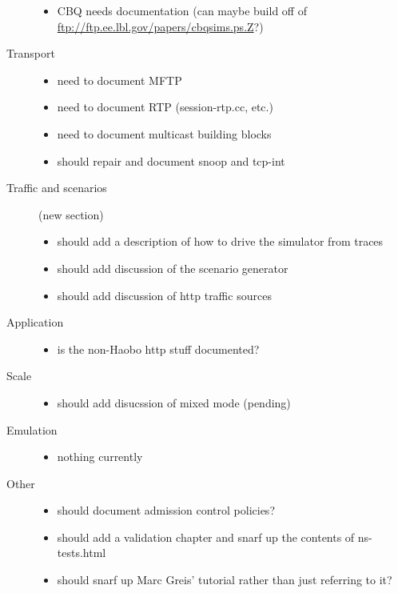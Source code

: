 \begin{description}
	\begin{itemize}
	\item CBQ needs documentation (can maybe build off of 
		\url{ftp://ftp.ee.lbl.gov/papers/cbqsims.ps.Z}?)
	\end{itemize}

\item[Transport]

	\begin{itemize}
	\item need to document MFTP
	\item need to document RTP (session-rtp.cc, etc.)
	\item need to document multicast building blocks
	\item should repair and document snoop and tcp-int
	\end{itemize}

\item[Traffic and scenarios] (new section)

	\begin{itemize}
	\item should add a description of how to drive the simulator
		from traces
	\item should add discussion of the scenario generator
	\item should add discussion of http traffic sources
	\end{itemize}

\item[Application]

	\begin{itemize}
	\item is the non-Haobo http stuff documented?
	\end{itemize}

\item[Scale]

	\begin{itemize}
	\item should add disucssion of mixed mode (pending)
	\end{itemize}

\item[Emulation]

	\begin{itemize}
	\item nothing currently
	\end{itemize}

\item[Other]

	\begin{itemize}
	\item should document admission control policies?
	\item should add a validation chapter and snarf
		up the contents of ns-tests.html
	\item should snarf up Marc Greis' tutorial
		rather than just referring to it?
	\end{itemize}

\end{description}

